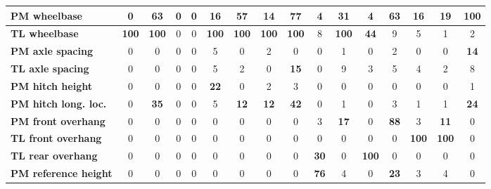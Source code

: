 \begin{table}[H]
\begin{tabular}{|l|c|c|c|c|c|c|c|c|c|c|c|c|c|c|c|}
\hline
\textcolor[rgb]{0.851, 0.373, 0.008}{\textbf{PM wheelbase}} & 0 & \textcolor[rgb]{0.000, 0.447, 0.698}{\textbf{63}} & 0 & 0 & \textbf{16} & \textcolor[rgb]{0.000, 0.447, 0.698}{\textbf{57}} & \textbf{14} & \textcolor[rgb]{0.000, 0.447, 0.698}{\textbf{77}} & 4 & \textcolor[rgb]{0.000, 0.620, 0.451}{\textbf{31}} & 4 & \textcolor[rgb]{0.000, 0.447, 0.698}{\textbf{63}} & \textbf{16} & \textbf{19} & \textcolor[rgb]{0.835, 0.369, 0.000}{\textbf{100}} \\
\hline
\textcolor[rgb]{0.851, 0.373, 0.008}{\textbf{TL wheelbase}} & \textcolor[rgb]{0.835, 0.369, 0.000}{\textbf{100}} & \textcolor[rgb]{0.835, 0.369, 0.000}{\textbf{100}} & 0 & 0 & \textcolor[rgb]{0.835, 0.369, 0.000}{\textbf{100}} & \textcolor[rgb]{0.835, 0.369, 0.000}{\textbf{100}} & \textcolor[rgb]{0.835, 0.369, 0.000}{\textbf{100}} & \textcolor[rgb]{0.835, 0.369, 0.000}{\textbf{100}} & 8 & \textcolor[rgb]{0.835, 0.369, 0.000}{\textbf{100}} & \textcolor[rgb]{0.000, 0.620, 0.451}{\textbf{44}} & 9 & 5 & 1 & 2 \\
\hline
\textbf{PM axle spacing} & 0 & 0 & 0 & 0 & 5 & 0 & 2 & 0 & 0 & 1 & 0 & 2 & 0 & 0 & \textbf{14} \\
\hline
\textbf{TL axle spacing} & 0 & 0 & 0 & 0 & 5 & 2 & 0 & \textbf{15} & 0 & 9 & 3 & 5 & 4 & 2 & 8 \\
\hline
\textbf{PM hitch height} & 0 & 0 & 0 & 0 & \textbf{22} & 0 & 2 & 3 & 0 & 0 & 0 & 0 & 0 & 0 & 1 \\
\hline
\textcolor[rgb]{0.000, 0.620, 0.451}{\textbf{PM hitch long. loc.}} & 0 & \textcolor[rgb]{0.000, 0.620, 0.451}{\textbf{35}} & 0 & 0 & 5 & \textbf{12} & \textbf{12} & \textcolor[rgb]{0.000, 0.620, 0.451}{\textbf{42}} & 0 & 1 & 0 & 3 & 1 & 1 & \textbf{24} \\
\hline
\textcolor[rgb]{0.000, 0.447, 0.698}{\textbf{PM front overhang}} & 0 & 0 & 0 & 0 & 0 & 0 & 0 & 0 & 3 & \textbf{17} & 0 & \textcolor[rgb]{0.000, 0.447, 0.698}{\textbf{88}} & 3 & \textbf{11} & 0 \\
\hline
\textcolor[rgb]{0.851, 0.373, 0.008}{\textbf{TL front overhang}} & 0 & 0 & 0 & 0 & 0 & 0 & 0 & 0 & 0 & 0 & 0 & 0 & \textcolor[rgb]{0.835, 0.369, 0.000}{\textbf{100}} & \textcolor[rgb]{0.835, 0.369, 0.000}{\textbf{100}} & 0 \\
\hline
\textcolor[rgb]{0.851, 0.373, 0.008}{\textbf{TL rear overhang}} & 0 & 0 & 0 & 0 & 0 & 0 & 0 & 0 & \textcolor[rgb]{0.000, 0.620, 0.451}{\textbf{30}} & 0 & \textcolor[rgb]{0.835, 0.369, 0.000}{\textbf{100}} & 0 & 0 & 0 & 0 \\
\hline
\textcolor[rgb]{0.000, 0.447, 0.698}{\textbf{PM reference height}} & 0 & 0 & 0 & 0 & 0 & 0 & 0 & 0 & \textcolor[rgb]{0.000, 0.447, 0.698}{\textbf{76}} & 4 & 0 & \textbf{23} & 3 & 4 & 0 \\

\end{tabular}
\end{table}
